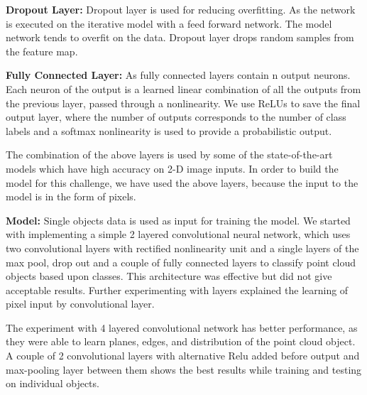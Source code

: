 \textbf{Dropout Layer:}
Dropout layer is used for reducing overfitting. As the network is executed on the iterative model with a feed forward network.
The model network tends to overfit on the data. Dropout layer drops random samples from the feature
map.

\textbf{Fully Connected Layer:}
As fully connected layers contain n output neurons. Each neuron of the output is a learned linear
combination of all the outputs from the previous layer, passed through a nonlinearity.
We use ReLUs to save the final output layer, where the number of outputs corresponds
to the number of class labels and a softmax nonlinearity is used to provide a probabilistic output.



The combination of the above layers is used by some of the state-of-the-art models which have high accuracy on 2-D image inputs.
In order to build the model for this challenge, we have used the above layers, because the input to the model is in the form of pixels.

\textbf{Model:}
Single objects data is used as input for training the model. We started with implementing a simple 2 layered convolutional neural network,
which uses two convolutional layers with rectified nonlinearity unit and a single layers of the max pool,
drop out and a couple of fully connected layers to classify point cloud objects based upon classes.
This architecture was effective but did not give acceptable results. Further experimenting with layers explained the learning of pixel input by convolutional layer.

The experiment with 4 layered convolutional network has better performance, as they were able to learn planes, edges, and distribution of the point cloud object.
A couple of 2 convolutional layers with alternative Relu added before output and max-pooling layer between them shows the best results while training and testing on individual objects.

